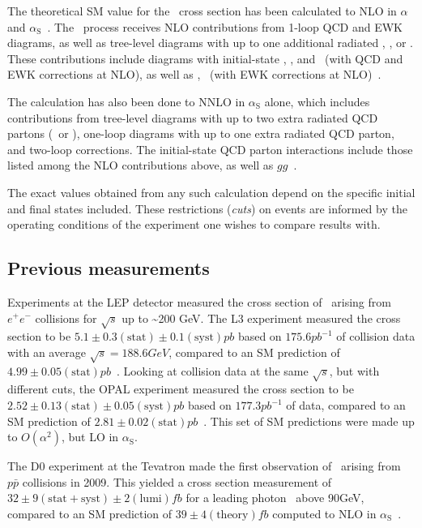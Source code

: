 The theoretical SM value for the \zinvg\ cross section has been calculated to NLO in $\alpha$ and $\alpha_\mathrm{S}$~\cite{ref:JHEP04(2015)018, ref:JHEP02(2016)057}.
The \zinvg\ process receives NLO contributions from 1-loop QCD and EWK diagrams, as well as tree-level diagrams with up to one additional radiated \Pgamma, \Pq, or \Pg.
These contributions include diagrams with initial-state \Pq\Paq, \Pq\Pg, and \Paq\Pg\ (with QCD and EWK corrections at NLO), as well as \Pq\Pgamma, \Paq\Pgamma\ (with EWK corrections
at NLO)~\cite{ref:JHEP02(2016)057}.

The calculation has also been done to NNLO in $\alpha_\mathrm{S}$ alone,
which includes contributions from tree-level diagrams with up to two extra radiated QCD partons (\Pq\ or \Pg), one-loop diagrams with up to one extra
radiated QCD parton, and two-loop corrections. The initial-state QCD parton interactions include those listed among the NLO contributions above,
as well as $gg$~\cite{ref:j.physletb.2014.02.037, ref:JHEP07(2015)085}.

The exact values obtained from any such calculation depend on the specific initial and final states included. These restrictions (\textit{cuts}) on events are
informed by the operating conditions of the experiment one wishes to compare results with.

\subsection{Previous measurements} \label{sec:introduction_znng_previous_measurements}
Experiments at the LEP detector measured the cross section of \zinvg\ arising from $e^{\mathrm{+}}e^{\mathrm{-}}$ collisions for $\sqrt{s}$ up to \textasciitilde200 GeV.
The L3 experiment measured the cross section to be $5.1 \pm 0.3\mathrm{(stat)} \pm 0.1\mathrm{(syst)}\unit{pb}$ based on $175.6\unit{pb}^{-1}$ of collision data with an average $\sqrt{s} = 188.6\unit{GeV}$, compared to an SM
prediction of $4.99 \pm 0.05\mathrm{(stat)}\unit{pb}$~\cite{ref:j.physletb.2004.07.002}. Looking at collision data at the same $\sqrt{s}$, but with different cuts,
the OPAL experiment measured the cross section to be $2.52 \pm 0.13\mathrm{(stat)} \pm 0.05\mathrm{(syst)}\unit{pb}$ based on $177.3\unit{pb}^{-1}$ of data, compared to an SM
prediction of $2.81 \pm 0.02\mathrm{(stat)}\unit{pb}$~\cite{ref:s100520000490}. This set of SM predictions were made up to $O(\alpha^2)$, but LO in $\alpha_\mathrm{S}$.

The D0 experiment at the Tevatron made the first observation of \zinvg\ arising from $p\bar{p}$ collisions in 2009. This yielded a cross section measurement of
$32 \pm 9\mathrm{(stat+syst)} \pm 2\mathrm{(lumi)}\unit{fb}$ for a leading photon \pT\ above 90\unit{GeV},
compared to an SM prediction of $39 \pm 4\mathrm{(theory)}\unit{fb}$ computed to NLO in $\alpha_\mathrm{S}$~\cite{ref:PhysRevLett.102.201802}.

